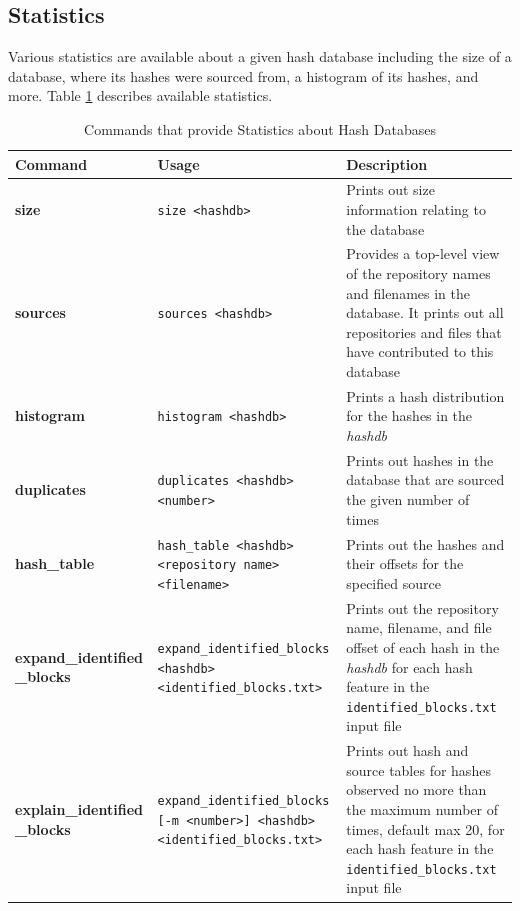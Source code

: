 \documentclass[11pt,fleqn]{article} %
\begin{document}
\subsection{Statistics}
Various statistics are available about a given hash database including the size of a database, where its hashes were sourced from, a histogram of its hashes, and more.
Table \ref{tab:statistics} describes available statistics.\\

\begin{table}[!ht]
\centering
\caption{Commands that provide Statistics about Hash Databases}
\label{tab:statistics}
\begin{tabular}{|p{3.5 cm}|p{6 cm}|p{4 cm}|}
\hline \hline
\textbf{Command} & \textbf{Usage} & \textbf{Description} \\
\hline
\textbf{size} & \verb+size <hashdb>+ & Prints out size information relating to the database\\
\hline
\textbf{sources} & \verb+sources <hashdb>+ & Provides a top-level view of the repository names and filenames in the database. It prints out all repositories and files that have contributed to this database\\
\hline
\textbf{histogram} & \verb+histogram <hashdb>+ &  Prints a hash distribution for the hashes in the \textit{hashdb}\\
\hline
\textbf{duplicates} & \verb+duplicates <hashdb> <number>+ &  Prints out hashes in the database that are sourced the given number of times\\
\hline
\textbf{hash\_table} & \verb+hash_table <hashdb>+ \verb+<repository name> <filename>+ &  Prints out the hashes and their offsets for the specified source\\
\hline
\textbf{expand\_identified} \textbf{\_blocks} & \verb+expand_identified_blocks+ \verb+<hashdb>+ \verb+<identified_blocks.txt>+ & Prints out the repository name, filename, and file offset of each hash in the \textit{hashdb} for each hash feature in the \texttt{identified\_blocks.txt} input file\\
\hline
\textbf{explain\_identified} \textbf{\_blocks} & \verb+expand_identified_blocks+ \verb+[-m <number>] <hashdb>+ \verb+<identified_blocks.txt>+ & Prints out hash and source tables for hashes observed no more than the maximum number of times, default max 20, for each hash feature in the \texttt{identified\_blocks.txt} input file\\
\hline
\end{tabular}
\end{table}
\end{document}
